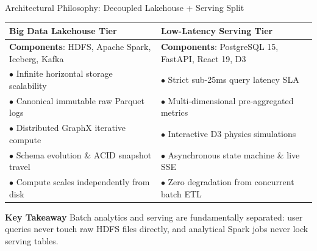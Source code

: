 \documentclass[aspectratio=169, 10pt]{beamer}
\begin{document}
\begin{frame}{Architectural Philosophy: Decoupled Lakehouse + Serving Split}
  \begin{center}
    \begin{tabularx}{\textwidth}{p{}|p{}}
      \rowcolor{SteelBlue!20}
      \textbf{\textcolor{NavyBlue}{Big Data Lakehouse Tier}} & \textbf{\textcolor{NavyBlue}{Low-Latency Serving Tier}} \\
      \midrule
      \textbf{Components}: HDFS, Apache Spark, Iceberg, Kafka & \textbf{Components}: PostgreSQL 15, FastAPI, React 19, D3 \\
      \midrule
      $\bullet$ Infinite horizontal storage scalability & $\bullet$ Strict sub-25ms query latency SLA \\
      $\bullet$ Canonical immutable raw Parquet logs & $\bullet$ Multi-dimensional pre-aggregated metrics \\
      $\bullet$ Distributed GraphX iterative compute & $\bullet$ Interactive D3 physics simulations \\
      $\bullet$ Schema evolution \& ACID snapshot travel & $\bullet$ Asynchronous state machine \& live SSE \\
      $\bullet$ Compute scales independently from disk & $\bullet$ Zero degradation from concurrent batch ETL \\
      \bottomrule
    \end{tabularx}
  \end{center}
  \vspace{0.2cm}
  \begin{exampleblock}{\textbf{Key Takeaway}}
    Batch analytics and serving are fundamentally separated: user queries never touch raw HDFS files directly, and analytical Spark jobs never lock serving tables.
  \end{exampleblock}
\end{frame}
\end{document}
